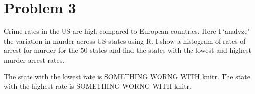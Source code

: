 \documentclass{article}
\newcommand{\rinline}[1]{SOMETHING WORNG WITH knitr}
\begin{document}
\section*{Problem 3}

Crime rates in the US are high compared to European countries. Here I `analyze' the variation in murder across US states using R. I show a histogram of rates of arrest for murder for the 50 states and find the states with the lowest and highest murder arrest rates.



The state with the lowest rate is \rinline{attributes(USArrests)$row.names[which.min(USArrests$Murder)]}. The state with the highest rate is \rinline{attributes(USArrests)$row.names[which.max(USArrests$Murder)]}.
\end{document}
